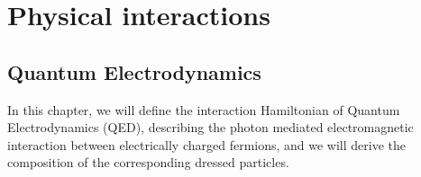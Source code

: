 \documentclass[10pt,a4paper,twoside,openany]{book}
\begin{document}







\part{Physical interactions}

\chapter{Quantum Electrodynamics}
\label{Quantum Electrodynamics}

In this chapter, we will define the interaction Hamiltonian of Quantum Electrodynamics (QED), describing the photon mediated electromagnetic interaction between electrically charged fermions, and we will derive the composition of the corresponding dressed particles.
\end{document}
